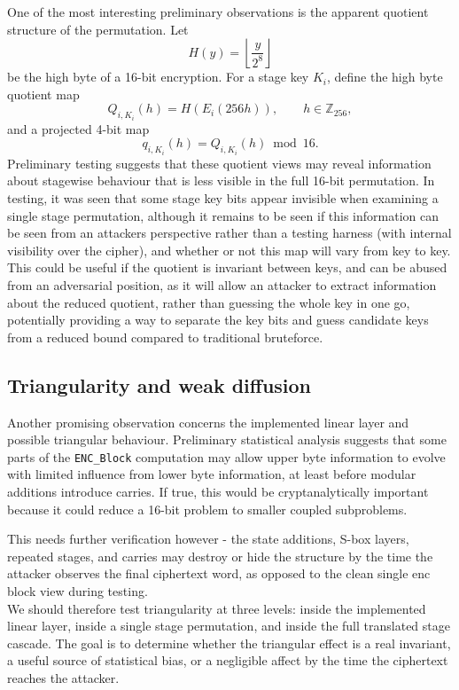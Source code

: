 \documentclass[11pt]{article}
\newcommand{\Z}[1]{\mathbb{Z}_{#1}}
\begin{document}
One of the most interesting preliminary observations is the apparent quotient structure of the permutation. Let
\[
H(y)=\left\lfloor \frac{y}{2^8}\right\rfloor
\]
be the high byte of a 16-bit encryption. For a stage key $K_i$, define the high byte quotient map
\[
Q_{i,K_i}(h)=H(E_i(256h)),\qquad h\in\Z{256},
\]
and a projected 4-bit map
\[
q_{i,K_i}(h)=Q_{i,K_i}(h)\bmod 16.
\]
Preliminary testing suggests that these quotient views may reveal information about stagewise behaviour that is less visible in the full 16-bit permutation. In testing, it was seen that some stage key bits appear invisible when examining a single stage permutation, although it remains to be seen if this information can be seen from an attackers perspective rather than a testing harness (with internal visibility over the cipher), and whether or not this map will vary from key to key.\\

This could be useful if the quotient is invariant between keys, and can be abused from an adversarial position, as it will allow an attacker to extract information about the reduced quotient, rather than guessing the whole key in one go, potentially providing a way to separate the key bits and guess candidate keys from a reduced bound compared to traditional bruteforce.\\

\subsection{Triangularity and weak diffusion}

Another promising observation concerns the implemented linear layer and possible triangular behaviour. Preliminary statistical analysis suggests that some parts of the \texttt{ENC\_Block} computation may allow upper byte information to evolve with limited influence from lower byte information, at least before modular additions introduce carries. If true, this would be cryptanalytically important because it could reduce a 16-bit problem to smaller coupled subproblems.

This needs further verification however - the state additions, S-box layers, repeated stages, and carries may destroy or hide the structure by the time the attacker observes the final ciphertext word, as opposed to the clean single enc block view during testing.\\

We should therefore test triangularity at three levels: inside the implemented linear layer, inside a single stage permutation, and inside the full translated stage cascade. The goal is to determine whether the triangular effect is a real invariant, a useful source of statistical bias, or a negligible affect by the time the ciphertext reaches the attacker.
\end{document}
